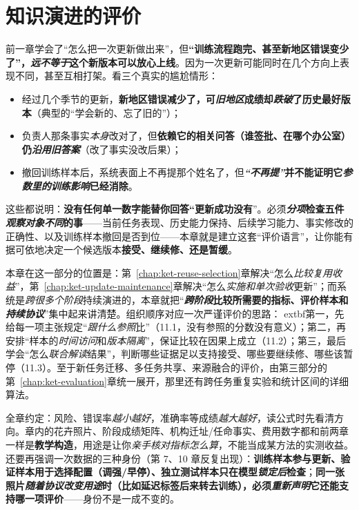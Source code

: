 \chapter{知识演进的评价}
\label{chap:ket-evolution-evaluation}

前一章学会了“怎么把一次更新做出来”，但\textbf{“训练流程跑完、甚至新地区错误变少了”，\emph{远不等于}这个新版本可以放心上线}。因为一次更新可能同时在几个方向上表现不同，甚至互相打架。看三个真实的尴尬情形：
\begin{itemize}\item 经过几个季节的更新，\textbf{新地区错误减少了，可\emph{旧地区}成绩却\emph{跌破}了历史最好版本}（典型的“学会新的、忘了旧的”）；\item 负责人那条事实\emph{本身}改对了，但\textbf{依赖它的相关问答（谁签批、在哪个办公室）仍\emph{沿用旧答案}}（改了事实没改后果）；\item 撤回训练样本后，系统表面上不再提那个姓名了，但\textbf{\emph{“不再提”}并不能证明它\emph{参数里的训练影响}已经消除}。\end{itemize}
这些都说明：\textbf{没有任何单一数字能替你回答“更新成功没有}”。必须\textbf{\emph{分项}检查五件\emph{观察对象不同}的事}——当前任务表现、历史能力保持、后续学习能力、事实修改的正确性、以及训练样本撤回是否到位——本章就是建立这套“评价语言”，让你能有据可依地决定一个候选版本\textbf{接受、继续修、还是暂缓}。

本章在这一部分的位置是：第~\ref{chap:ket-reuse-selection}章解决“怎么\emph{比较复用收益}”，第~\ref{chap:ket-update-maintenance}章解决“怎么\emph{实施和单次验收}更新”；而系统是\emph{跨很多个阶段}持续演进的，本章就把“\textbf{\emph{跨阶段}比较所需要的指标、评价样本和\emph{持续协议}}”集中起来讲清楚。组织顺序对应一次严谨评价的思路：	extbf{第一，先给每一项主张规定“\emph{跟\emph{什么}参照}比”（11.1，没有参照的分数没有意义）；第二，再安排“样本的\emph{时间访问}和\emph{版本隔离}”，保证比较在因果上成立（11.2）；第三，最后学会“怎么\emph{联合解读}结果”，判断哪些证据足以支持接受、哪些要继续修、哪些该暂停（11.3）}。至于新任务迁移、多任务共享、来源融合的评价，由第三部分的第~\ref{chap:ket-evaluation}章统一展开，那里还有跨任务重复实验和统计区间的详细算法。

全章约定：风险、错误率\emph{越小越好}，准确率等成绩\emph{越大越好}，读公式时先看清方向。章内的花卉照片、阶段成绩矩阵、机构迁址/任命事实、费用数字都和前两章一样是\textbf{教学构造}，用途是让你\emph{亲手核对指标怎么算}，不能当成某方法的实测收益。还要再强调一次数据的三种身份（第 7、10 章反复出现）：\textbf{训练样本参与更新、验证样本用于选择配置（调强/早停）、独立测试样本只在模型\emph{锁定后}检查}；\textbf{同一张照片\emph{随着协议改变用途}时（比如延迟标签后来转去训练），必须\emph{重新声明}它还能支持哪一项评价}——身份不是一成不变的。


